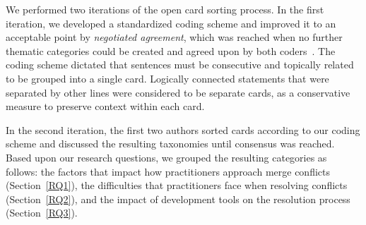 We performed two iterations of the open card sorting process.
In the first iteration, we developed a standardized coding scheme and improved it to an acceptable point by \textit{negotiated agreement}, which was reached when no further thematic categories could be created and agreed upon by both coders~\cite{garrison2006revisiting}\cite{ritchie2013qualitative}.
The coding scheme dictated that sentences must be consecutive and topically related to be grouped into a single card.
Logically connected statements that were separated by other lines were considered to be separate cards, as a conservative measure to preserve context within each card.

In the second iteration, the first two authors sorted cards according to our coding scheme and discussed the resulting taxonomies until consensus was reached.
Based upon our research questions, we grouped the resulting categories as follows: the factors that impact how practitioners approach merge conflicts (Section~\ref{RQ1}), the difficulties that practitioners face when resolving conflicts (Section~\ref{RQ2}), and the impact of development tools on the resolution process (Section~\ref{RQ3}).


